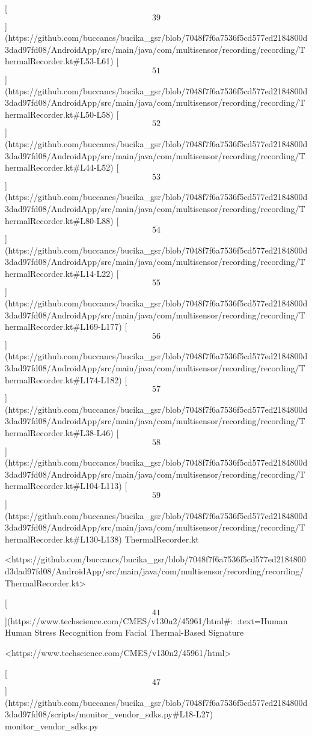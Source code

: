 \documentclass[12pt,a4paper]{article}
\begin{document}
[\[39\]](https://github.com/buccancs/bucika_gsr/blob/7048f7f6a7536f5cd577ed2184800d3dad97fd08/AndroidApp/src/main/java/com/multisensor/recording/recording/ThermalRecorder.kt#L53-L61)
[\[51\]](https://github.com/buccancs/bucika_gsr/blob/7048f7f6a7536f5cd577ed2184800d3dad97fd08/AndroidApp/src/main/java/com/multisensor/recording/recording/ThermalRecorder.kt#L50-L58)
[\[52\]](https://github.com/buccancs/bucika_gsr/blob/7048f7f6a7536f5cd577ed2184800d3dad97fd08/AndroidApp/src/main/java/com/multisensor/recording/recording/ThermalRecorder.kt#L44-L52)
[\[53\]](https://github.com/buccancs/bucika_gsr/blob/7048f7f6a7536f5cd577ed2184800d3dad97fd08/AndroidApp/src/main/java/com/multisensor/recording/recording/ThermalRecorder.kt#L80-L88)
[\[54\]](https://github.com/buccancs/bucika_gsr/blob/7048f7f6a7536f5cd577ed2184800d3dad97fd08/AndroidApp/src/main/java/com/multisensor/recording/recording/ThermalRecorder.kt#L14-L22)
[\[55\]](https://github.com/buccancs/bucika_gsr/blob/7048f7f6a7536f5cd577ed2184800d3dad97fd08/AndroidApp/src/main/java/com/multisensor/recording/recording/ThermalRecorder.kt#L169-L177)
[\[56\]](https://github.com/buccancs/bucika_gsr/blob/7048f7f6a7536f5cd577ed2184800d3dad97fd08/AndroidApp/src/main/java/com/multisensor/recording/recording/ThermalRecorder.kt#L174-L182)
[\[57\]](https://github.com/buccancs/bucika_gsr/blob/7048f7f6a7536f5cd577ed2184800d3dad97fd08/AndroidApp/src/main/java/com/multisensor/recording/recording/ThermalRecorder.kt#L38-L46)
[\[58\]](https://github.com/buccancs/bucika_gsr/blob/7048f7f6a7536f5cd577ed2184800d3dad97fd08/AndroidApp/src/main/java/com/multisensor/recording/recording/ThermalRecorder.kt#L104-L113)
[\[59\]](https://github.com/buccancs/bucika_gsr/blob/7048f7f6a7536f5cd577ed2184800d3dad97fd08/AndroidApp/src/main/java/com/multisensor/recording/recording/ThermalRecorder.kt#L130-L138)
ThermalRecorder.kt

<https://github.com/buccancs/bucika_gsr/blob/7048f7f6a7536f5cd577ed2184800d3dad97fd08/AndroidApp/src/main/java/com/multisensor/recording/recording/ThermalRecorder.kt>

[\[41\]](https://www.techscience.com/CMES/v130n2/45961/html#:~:text=Human%
Human Stress Recognition from Facial Thermal-Based Signature

<https://www.techscience.com/CMES/v130n2/45961/html>

[\[47\]](https://github.com/buccancs/bucika_gsr/blob/7048f7f6a7536f5cd577ed2184800d3dad97fd08/scripts/monitor_vendor_sdks.py#L18-L27)
monitor_vendor_sdks.py
\end{document}
